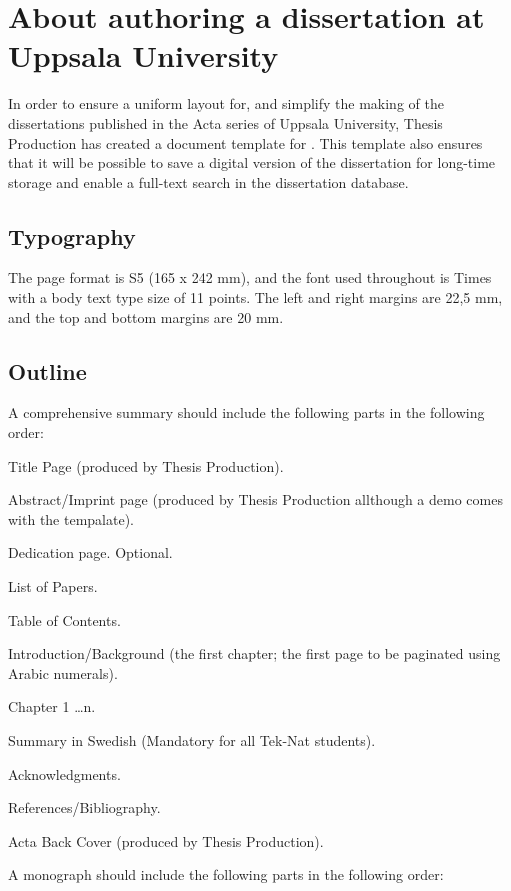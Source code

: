 \vspace{\baselineskip}


\chapter[About authoring a dissertation at Uppsala University]{About authoring a dissertation \linebreak[3]at Uppsala University}
In order to ensure a uniform layout for, and simplify the making of the dissertations published in the Acta series of Uppsala
University, Thesis Production has created a document template for \LaTeXe{}. This template also ensures that it will be possible to save a digital version of the dissertation for long-time storage and enable a full-text search in the dissertation
database.
\section{Typography}

The page format is S5 (165 x 242 mm), and the font used throughout is Times with a body text type size of 11 points. The left and right margins are 22,5 mm, and the top and bottom margins are 20 mm.
\section{Outline}
A comprehensive summary should include the following parts in the following order:
\begin{bulletlist}
    \item Title Page (produced by Thesis Production).
    \item Abstract/Imprint page (produced by Thesis Production all\-though a demo comes with the tempalate).
    \item Dedication page. Optional.
    \item List of Papers.
    \item Table of Contents.
    \item Introduction/Background (the first chapter; the first page to be paginated using Arabic numerals).
    \item Chapter 1 \ldots n.
    \item Summary in Swedish (Mandatory for all Tek-Nat students).
    \item Acknowledgments.
    \item References/Bibliography.
    \item Acta Back Cover (produced by Thesis Production).
\end{bulletlist}
\vspace{1\baselineskip}
A monograph should include the following parts in the following order:

